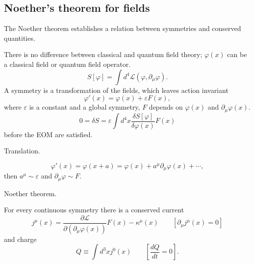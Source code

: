 \subsection{Noether's theorem for fields}

\qquad The Noether theorem establishes a relation between symmetries and conserved quantities.

\qquad There is no difference between classical and quantum field theory; $\varphi(x)$ can be a classical field or quantum field operator.
        $$S[\varphi] = \int d^4 \mathcal{L}(\varphi, \partial_\mu \varphi).$$
A symmetry is a transformation of the fields, which leaves action invariant
        $$\varphi'(x) = \varphi(x) + \varepsilon F(x),$$
where $\varepsilon$ is a constant and a global symmetry, $F$ depends on $\varphi(x)$ and $\partial_\mu \varphi(x)$.
        $$0= \delta S = \varepsilon \int d^4 x \frac{\delta S[\varphi]}{\delta \varphi(x)} F(x)$$
before the EOM are satisfied.

\begin{example} Translation.

   $$\varphi'(x) = \varphi(x+a) = \varphi(x) + a^\mu \partial_\mu \varphi(x) + \cdots,$$
then $a^\mu \sim \varepsilon$ and $\partial_\mu \varphi \sim F$.
\end{example}

\begin{theorem} Noether theorem.

    \qquad For every continuous symmetry there is a conserved current
            $$j^\mu(x) = \frac{\partial \mathcal{L}}{\partial ( \partial_\mu \varphi(x))} F(x)- \kappa^\mu(x) \qquad [\partial_\mu j^\mu(x) = 0]$$
    and charge
            $$Q \equiv \int d^3 x j^0(x) \qquad [\frac{d Q}{d t}=0].$$
\end{theorem}

